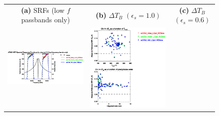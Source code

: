 \begin{figure}[H]
  \centering
  \begin{tabular}{c c c}
    \textsf{\textbf{(a)} SRFs (low $f$ passbands only)} &
    \textsf{\textbf{(b)} $\Delta T_B$ $(\epsilon_s = 1.0)$} &
    \textsf{\textbf{(c)} $\Delta T_B$ $(\epsilon_s = 0.6)$} \\
    \includegraphics[bb=80 400 280 558,clip,scale=0.85]{graphics/srf/Vset/atms_npp.ch14.osrf.eps} &
    \includegraphics[bb=85 400 260 558,clip,scale=0.85]{graphics/dtb/Vset/e1.0_r0.0/atms_npp.ch14.dTb.eps} & 

\end{tabular}
\end{figure}
